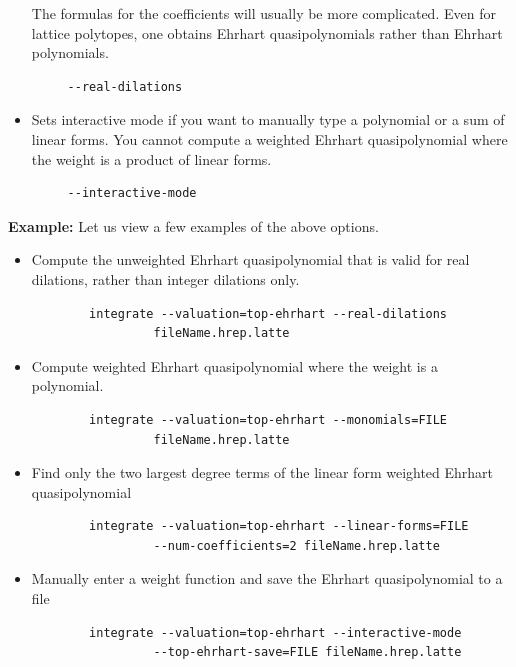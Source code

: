 \documentclass{article}
\newcommand{\example}{{\bf Example:\space}}
\begin{document}
\begin{itemize}
  The formulas for the
  coefficients will usually be more complicated.  Even for lattice polytopes,
  one obtains Ehrhart quasipolynomials rather than Ehrhart polynomials.
        \begin{verbatim}
     --real-dilations
        \end{verbatim}          
\item Sets interactive mode if you want to manually type a polynomial or a sum of linear forms. You cannot compute a weighted Ehrhart quasipolynomial where the weight is a product of linear forms.
        \begin{verbatim}
     --interactive-mode
        \end{verbatim}          
\end{itemize}

\example
Let us view a few examples of the above options.

\begin{itemize}
\item Compute the unweighted Ehrhart quasipolynomial that is valid for real
  dilations, rather than integer dilations only. 
\begin{verbatim}
        integrate --valuation=top-ehrhart --real-dilations  
                 fileName.hrep.latte
        \end{verbatim}  
\item Compute weighted Ehrhart quasipolynomial where the weight is a polynomial.
        \begin{verbatim}
        integrate --valuation=top-ehrhart --monomials=FILE 
                 fileName.hrep.latte
        \end{verbatim}  
\item Find only the two largest degree terms of the linear form weighted Ehrhart quasipolynomial
        \begin{verbatim}
        integrate --valuation=top-ehrhart --linear-forms=FILE 
                 --num-coefficients=2 fileName.hrep.latte                               
        \end{verbatim}  
\item Manually enter a weight function and save the Ehrhart quasipolynomial to a file
        \begin{verbatim}
        integrate --valuation=top-ehrhart --interactive-mode 
                 --top-ehrhart-save=FILE fileName.hrep.latte
        \end{verbatim}  
\end{itemize}
\end{document}
